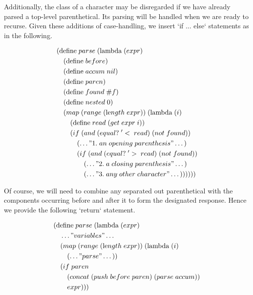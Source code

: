 Additionally, the class of a character may be disregarded if we have already parsed a 
top-level parenthetical. Its parsing will be handled when we are ready to recurse. Given 
these additions of case-handling, we insert `if ... else` statements as in the following.

\begin{align*}
& (\text{define} \; parse \; (\text{lambda} \; (expr) \; 
\\& \quad (\text{define} \; before)
\\& \quad (\text{define} \; accum \; nil)
\\& \quad (\text{define} \; paren)
\\& \quad (\text{define} \; found \; \#f)
\\& \quad (\text{define} \; nested \; 0)
\\& \quad (map \; (range \; (\text{le}ngth \; expr)) \; (\text{lambda} \; (i)
\\& \qquad (\text{define} \; read \; (get \; expr \; i))
\\& \qquad (if \; (and \; (equal? \; '< \; read) \; (not \; found))
\\& \qquad \quad (\dots"1. \; an \; opening \; parenthesis"\dots)
\\& \qquad \quad (if \; (and \; (equal? \; '> \; read) \; (not \; found))
\\& \qquad \qquad (\dots"2. \; a \; closing \; parenthesis"\dots)
\\& \qquad \qquad (\dots"3. \; any \; other \; character"\dots))))))
\end{align*}

Of course, we will need to combine any separated out parenthetical with the components 
occurring before and after it to form the designated response. Hence we provide the 
following `return` statement.

\begin{align*}
& (\text{define} \; parse \; (\text{lambda} \; (expr) \; 
\\& \quad \dots"variables"\dots
\\& \quad (map \; (range \; (\text{le}ngth \; expr)) \; (\text{lambda} \; (i)
\\& \qquad (\dots"parse"\dots))
\\& \quad (if \; paren
\\& \qquad (concat \; (push \; before \; paren) \; (parse \; accum))
\\& \qquad expr)))
\end{align*}

